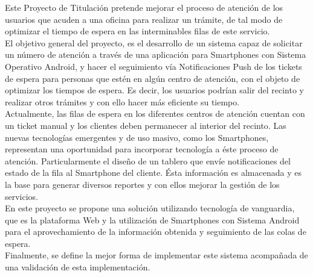 Este Proyecto de Titulación pretende mejorar el proceso de atención de los usuarios que acuden a una oficina para realizar un trámite, de tal modo de optimizar el tiempo de espera en las interminables filas de este servicio.\\

El objetivo general del proyecto, es el desarrollo de un sistema capaz de solicitar un número de atención a través de una aplicación para Smartphones con Sistema Operativo Android, y hacer el seguimiento vía Notificaciones Push de los tickets de espera para personas que estén en algún centro de atención, con el objeto de optimizar los tiempos de espera. Es decir, los usuarios podrían salir del recinto y realizar otros trámites y con ello hacer más eficiente su tiempo.\\

Actualmente, las filas de espera en los diferentes centros de atención cuentan con un ticket manual y los clientes deben permanecer al interior del recinto. Las nuevas tecnologías emergentes y de uso masivo, como los Smartphones, representan una oportunidad para incorporar tecnología a éste proceso de atención. Particularmente el diseño de un tablero que envíe notificaciones del estado de la fila al Smartphone del cliente. Ésta información  es almacenada y es la base para generar diversos reportes y con ellos mejorar la gestión de los servicios.\\

En este proyecto se propone una solución utilizando tecnología de vanguardia, que es la plataforma Web y la utilización de Smartphones con Sistema Android para el aprovechamiento de la información obtenida y seguimiento de las colas de espera.\\

Finalmente, se define la mejor forma de implementar este sistema acompañada de una validación de esta implementación.\\


